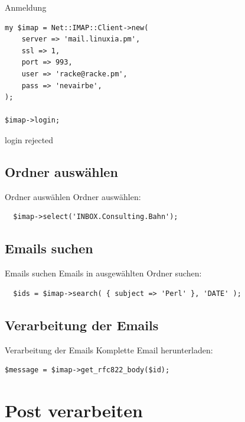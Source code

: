 \begin{frame}[fragile]{Anmeldung}
\begin{verbatim}
my $imap = Net::IMAP::Client->new(
    server => 'mail.linuxia.pm',
    ssl => 1,
    port => 993,
    user => 'racke@racke.pm',
    pass => 'nevairbe',
);

$imap->login;
\end{verbatim}
\end{frame}

login rejected

\subsection{Ordner auswählen}

\begin{frame}[fragile]{Ordner auswählen}
  Ordner auswählen:

\begin{verbatim}
  $imap->select('INBOX.Consulting.Bahn');
\end{verbatim}
\end{frame}

\subsection{Emails suchen}

\begin{frame}[fragile]{Emails suchen}
  Emails in ausgewählten Ordner suchen:

\begin{verbatim}
  $ids = $imap->search( { subject => 'Perl' }, 'DATE' );
\end{verbatim}
\end{frame}

\subsection{Verarbeitung der Emails}

\begin{frame}[fragile]{Verarbeitung der Emails}
  Komplette Email herunterladen:

\begin{verbatim}
$message = $imap->get_rfc822_body($id);
\end{verbatim}
\end{frame}

\section{Post verarbeiten}

